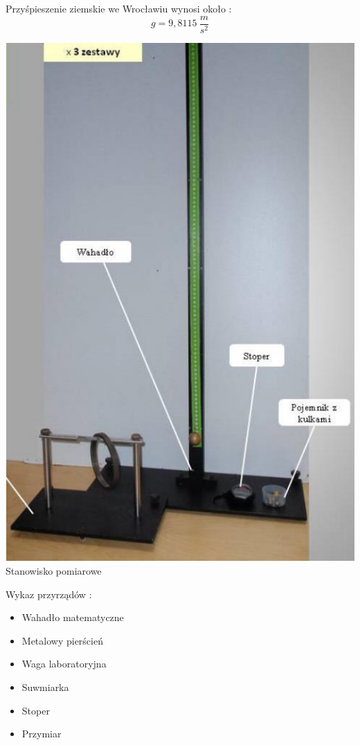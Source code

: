\documentclass[12pt]{article}
\begin{document}
Przyśpieszenie ziemskie we Wrocławiu wynosi około :
$$ g = 9,8115 \ \frac{m}{s^2} $$

\begin{center}
\includegraphics[scale=0.6]{schemat.png} \\
Stanowisko pomiarowe \\
\end{center}

Wykaz przyrządów : 
\begin{itemize}
    \item Wahadło matematyczne
    \item Metalowy pierścień
    \item Waga laboratoryjna
    \item Suwmiarka
    \item Stoper
    \item Przymiar
\end{itemize}
\end{document}
